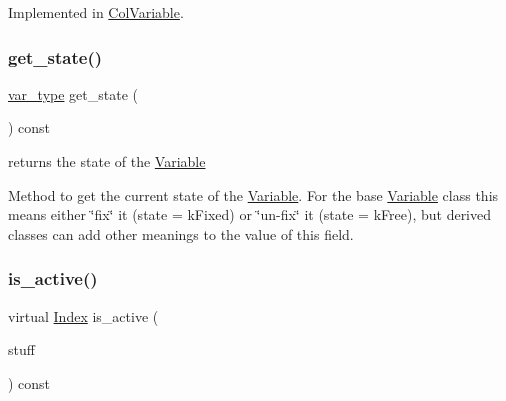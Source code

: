 Implemented in \mbox{\hyperlink{class_s_m_spp__di__unipi__it_1_1_col_variable_aad5c7fae8bf5c960045590272201d88e}{Col\+Variable}}.

\mbox{\label{class_s_m_spp__di__unipi__it_1_1_variable_abdc6f84bc8ff679bb6fcababcfb1ace5}} 
\subsubsection{\texorpdfstring{get\+\_\+state()}{get\_state()}}
{\footnotesize\ttfamily \mbox{\hyperlink{class_s_m_spp__di__unipi__it_1_1_variable_a32378add5594ab0f1fb45e711d88924d}{var\+\_\+type}} get\+\_\+state (\begin{DoxyParamCaption}\item[{void}]{ }\end{DoxyParamCaption}) const\hspace{0.3cm}{\ttfamily [inline]}}



returns the state of the \mbox{\hyperlink{class_s_m_spp__di__unipi__it_1_1_variable}{Variable}} 

Method to get the current state of the \mbox{\hyperlink{class_s_m_spp__di__unipi__it_1_1_variable}{Variable}}. For the base \mbox{\hyperlink{class_s_m_spp__di__unipi__it_1_1_variable}{Variable}} class this means either \char`\"{}fix\char`\"{} it (state = k\+Fixed) or \char`\"{}un-\/fix\char`\"{} it (state = k\+Free), but derived classes can add other meanings to the value of this field. \mbox{\label{class_s_m_spp__di__unipi__it_1_1_variable_a20d389d57c1714ae3c53978c3e6fa987}} 
\subsubsection{\texorpdfstring{is\+\_\+active()}{is\_active()}}
{\footnotesize\ttfamily virtual \mbox{\hyperlink{class_s_m_spp__di__unipi__it_1_1_variable_ad53d6229d7ec28555a9c9c2fd9abf773}{Index}} is\+\_\+active (\begin{DoxyParamCaption}\item[{\mbox{\hyperlink{class_s_m_spp__di__unipi__it_1_1_thin_var_dep_interface}{Thin\+Var\+Dep\+Interface}} $\ast$}]{stuff }\end{DoxyParamCaption}) const\hspace{0.3cm}{\ttfamily [pure virtual]}}



